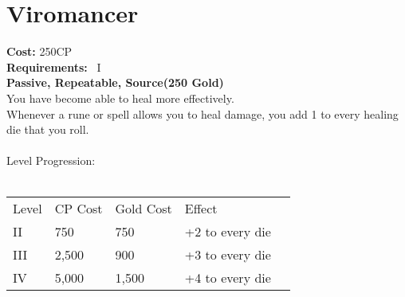 \section{Viromancer}\label{perk:viromancer}
\textbf{Cost:} 250CP\\
\textbf{Requirements:}~ I\\
\textbf{Passive, Repeatable, Source(250 Gold)}\\
You have become able to heal more effectively.\\
Whenever a rune or spell allows you to heal damage, you add 1 to every healing die that you roll.\\
\\
Level Progression:\\
\\
\begin{tabular}{l | l | l | l | l}
    Level & CP Cost & Gold Cost &  Effect\\
    II & 750 & 750 & +2 to every die\\
    III & 2,500 & 900 & +3 to every die\\
    IV & 5,000 & 1,500 & +4 to every die\\
\end{tabular}